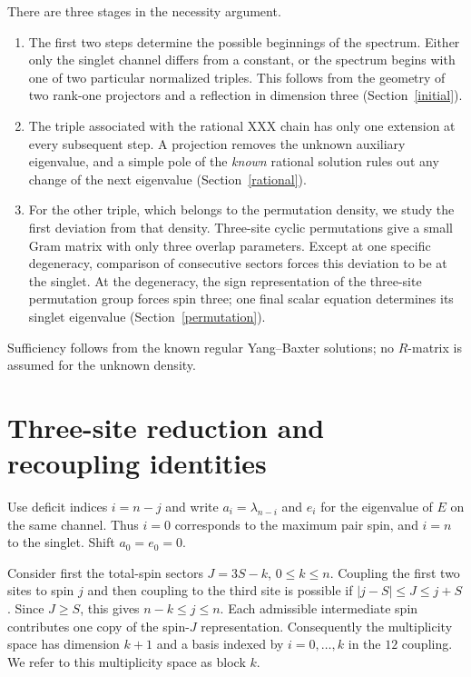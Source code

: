 \documentclass[11pt]{article}
\begin{document}
There are three stages in the necessity argument.
\begin{enumerate}
\setlength{\itemsep}{2pt}
\setlength{\parsep}{0pt}
\item The first two steps determine the possible beginnings of the spectrum. Either only the singlet channel differs from a constant, or the spectrum begins with one of two particular normalized triples. This follows from the geometry of two rank-one projectors and a reflection in dimension three (Section~\ref{initial}).
\item The triple associated with the rational XXX chain has only one extension at every subsequent step. A projection removes the unknown auxiliary eigenvalue, and a simple pole of the \emph{known} rational solution rules out any change of the next eigenvalue (Section~\ref{rational}).
\item For the other triple, which belongs to the permutation density, we study the first deviation from that density. Three-site cyclic permutations give a small Gram matrix with only three overlap parameters. Except at one specific degeneracy, comparison of consecutive sectors forces this deviation to be at the singlet. At the degeneracy, the sign representation of the three-site permutation group forces spin three; one final scalar equation determines its singlet eigenvalue (Section~\ref{permutation}).
\end{enumerate}
Sufficiency follows from the known regular Yang--Baxter solutions; no $R$-matrix is assumed for the unknown density.

\section{Three-site reduction and recoupling identities}
Use deficit indices $i=n-j$ and write $a_i=\lambda_{n-i}$ and $e_i$ for the eigenvalue of $E$ on the same channel. Thus $i=0$ corresponds to the maximum pair spin, and $i=n$ to the singlet. Shift $a_0=e_0=0$.

Consider first the total-spin sectors $J=3S-k$, $0\le k\le n$. Coupling the first two sites to spin $j$ and then coupling to the third site is possible if $|j-S|\le J\le j+S$. Since $J\ge S$, this gives $n-k\le j\le n$. Each admissible intermediate spin contributes one copy of the spin-$J$ representation. Consequently the multiplicity space has dimension $k+1$ and a basis indexed by $i=0,\ldots,k$ in the $12$ coupling. We refer to this multiplicity space as block $k$.
\end{document}
